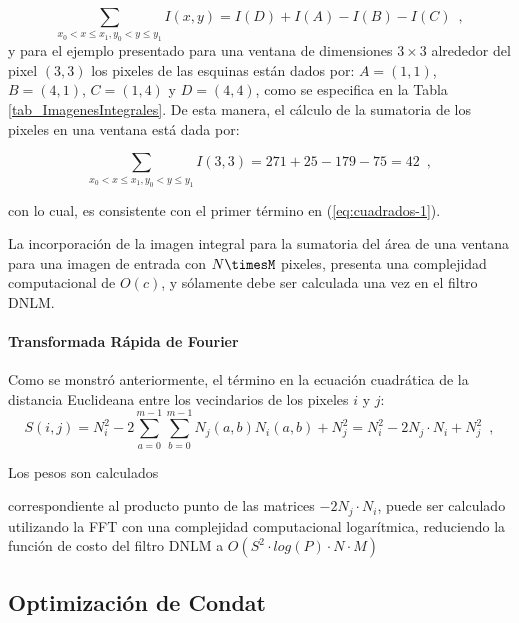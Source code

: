 \begin{equation}
\sum_{x_{0}<x\leq x_{1},y_{0}<y\leq y_{1}}I\left(x,y\right)=I\left(D\right)+I\left(A\right)-I\left(B\right)-I\left(C\right) \enspace ,
\end{equation}
y para el ejemplo presentado para una ventana de dimensiones $3\times3$ alrededor del pixel $(3,3)$ los pixeles de las esquinas est\'an dados por: $A=\left(1,1\right)$, $B=\left(4,1\right)$,
$C=\left(1,4\right)$ y $D=\left(4,4\right)$, como se especifica en la Tabla \ref{tab_ImagenesIntegrales}. De esta manera, el c\'alculo de la sumatoria de los pixeles en una ventana est\'a dada por: 

\begin{equation}
\sum_{x_{0}<x\leq x_{1},y_{0}<y\leq y_{1}}I\left(3,3\right)=271+25-179-75=42 \enspace ,
\end{equation}

con lo cual, es consistente con el primer t\'ermino en (\ref{eq:cuadrados-1}). 

La incorporaci\'on de la imagen integral para la sumatoria del \'area de una ventana para una imagen de entrada con $N\timesM$ pixeles, presenta una complejidad computacional de $O(c)$, y s\'olamente debe ser calculada una vez en el filtro DNLM.


\paragraph{Transformada R\'apida de Fourier}

Como se monstr\'o anteriormente, el t\'ermino en la ecuaci\'on cuadr\'atica de la distancia Euclideana entre los vecindarios de los pixeles $i$ y $j$:
\begin{equation}
S\left(i,j\right)=N_{i}^{2}-2\sum_{a=0}^{m-1}\sum_{b=0}^{m-1}N_{j}\left(a,b\right)N_{i}\left(a,b\right)+N_{j}^{2} =N_{i}^{2}-2N_{j}\cdot N_{i}+N_{j}^{2} \enspace , 
\end{equation}


Los pesos son calculados



correspondiente al producto punto de las matrices $-2N_{j}\cdot N_{i}$,  puede ser calculado utilizando la FFT con una complejidad computacional logar\'itmica, reduciendo la funci\'on de costo del filtro DNLM a $O(S^2 \cdot log(P) \cdot N \cdot M)$



\subsection{Optimizaci\'on de Condat}
\label{ch:marco_condat}

